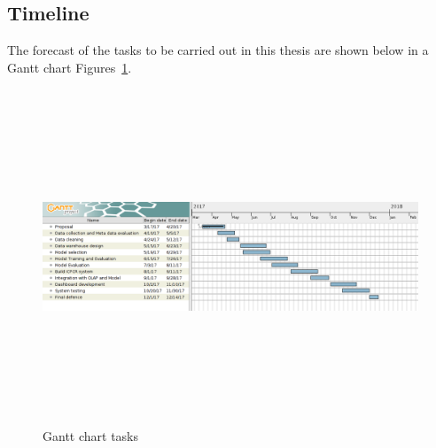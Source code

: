 \newpage
\begin{landscape}
\section{Timeline}
 The forecast of the tasks to be carried out in this thesis are shown below in a Gantt chart Figures~\ref{fig:time1}.
 \\
  \begin{figure}[H]
  	\includegraphics[width=25cm, height=10cm]{figures/churngantt3.png}
  	\centering
  	\caption{Gantt chart tasks}
  	\label{fig:time1}
  \end{figure}
\end{landscape}







\FloatBarrier
